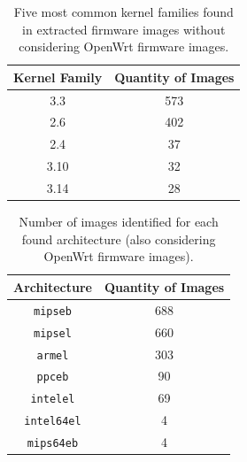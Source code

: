 \begin{table}[h]
\centering
\caption{Five most common kernel families found in extracted firmware images without considering OpenWrt firmware images.}
\begin{tabular}{cc}
\hline
\textbf{Kernel Family} & \textbf{Quantity of Images} \\ \hline
3.3                     & 573                \\ 
2.6                     & 402                \\ 
2.4                     &  37                \\ 
3.10                    &  32                \\ 
3.14                    &  28                \\ \hline
\end{tabular}
\label{tab:kernel-family-stats}
\end{table}


\begin{table}[h]
\centering
\caption{Number of images identified for each found architecture (also considering OpenWrt firmware images).}
\begin{tabular}{cc}
\hline
\textbf{Architecture}       & \textbf{Quantity of Images} \\ \hline
{\tt mipseb}                & 688                         \\ 
{\tt mipsel}                & 660                         \\ 
{\tt armel}                 & 303                         \\ 
{\tt ppceb}                 & 90                          \\ 
{\tt intelel}               & 69                          \\ 
{\tt intel64el}             & 4                           \\ 
{\tt mips64eb}              & 4                           \\ \hline
\end{tabular}
\label{tab:arch-stats-openwrt}
\end{table}


